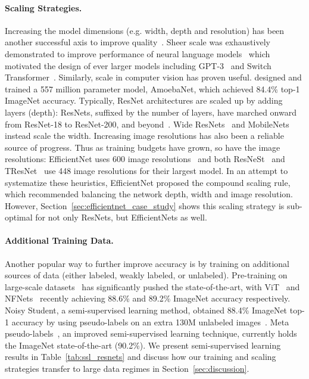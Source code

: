 \documentclass{article}
\begin{document}
\paragraph{Scaling Strategies.}
Increasing the model dimensions (e.g. width, depth and resolution) has been another successful axis to improve quality~\cite{rosenfeld2019constructive,hestness2017deep}.
Sheer scale was exhaustively demonstrated to improve performance of neural language models~\cite{kaplan2020scaling} which motivated the design of ever larger models including GPT-3~\cite{brown2020language} and Switch Transformer~\cite{fedus2021switch}.
Similarly, scale in computer vision has proven useful.
\citet{huang2018gpipe} designed and trained a 557 million parameter model, AmoebaNet, which achieved 84.4\% top-1 ImageNet accuracy.
Typically, ResNet architectures are scaled up by adding layers (depth): ResNets, suffixed by the number of layers, have marched onward from ResNet-18 to ResNet-200, and beyond~\cite{he2016identity,zhang2020resnest,bello2021lambdanetworks}.
Wide ResNets~\cite{zagoruyko2016wide} and MobileNets~\cite{howard2017mobilenets} instead scale the width.
Increasing image resolutions has also been a reliable source of progress.
Thus as training budgets have grown, so have the image resolutions:  EfficientNet uses 600 image resolutions~\cite{tan2019efficientnet} and both ResNeSt~\cite{zhang2020resnest} and TResNet~\cite{ridnik2020tresnet} use 448 image resolutions for their largest model. 
In an attempt to systematize these heuristics, EfficientNet proposed the compound scaling rule, which recommended balancing the network depth, width and image resolution.
However, Section~\ref{sec:efficientnet_case_study} shows this scaling strategy is sub-optimal for not only ResNets, but EfficientNets as well. 

\paragraph{Additional Training Data.}
Another popular way to further improve accuracy is by training on additional sources of data (either labeled, weakly labeled, or unlabeled).
Pre-training on large-scale datasets~\cite{sun2017revisiting,mahajan2018exploring,kolesnikov2019big} has significantly pushed the state-of-the-art, with ViT~\cite{dosovitskiy2020image} and NFNets~\cite{brock2021highperformance} recently achieving 88.6\% and 89.2\% ImageNet accuracy respectively.
Noisy Student, a semi-supervised learning method, obtained 88.4\% ImageNet top-1 accuracy by using pseudo-labels on an extra 130M unlabeled images~\cite{xie2020self}.
Meta pseudo-labels~\cite{pham2020meta}, an improved semi-supervised learning technique, currently holds the ImageNet state-of-the-art (90.2\%).
We present semi-supervised learning results in Table~\ref{tab:ssl_resnets} and discuss how our training and scaling strategies transfer to large data regimes in Section~\ref{sec:discussion}.
\end{document}
